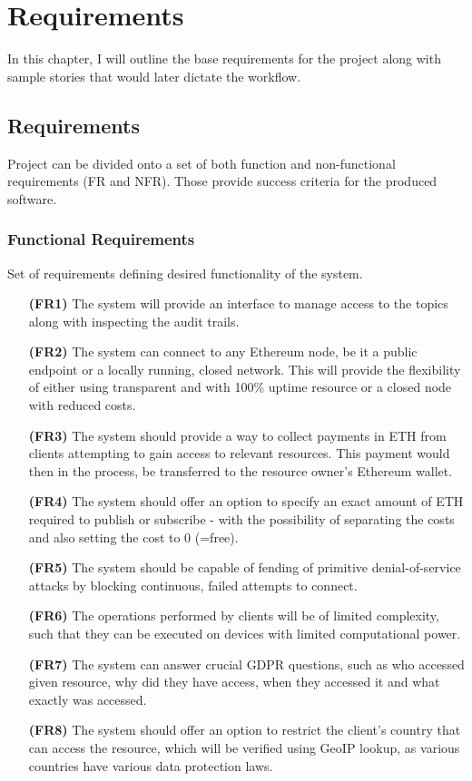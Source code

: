 \chapter{Requirements}
In this chapter, I will outline the base requirements for the project along with sample stories that would later dictate the workflow.

\section{Requirements}

Project can be divided onto a set of both function and non-functional requirements (FR and NFR). Those provide success criteria for the  produced software.

\subsection{Functional Requirements}
Set of requirements defining desired functionality of the system.

\begin{itemize}[leftmargin=4.5em]
\item[\textbf{(FR1)}] The system will provide an interface to manage access to the topics along with inspecting the audit trails.
\item[\textbf{(FR2)}] The system can connect to any Ethereum node, be it a public endpoint or a locally running, closed network. This will provide the flexibility of either using transparent and with 100\% uptime resource or a closed node with reduced costs.
\item[\textbf{(FR3)}] The system should provide a way to collect payments in ETH from clients attempting to gain access to relevant resources. This payment would then in the process, be transferred to the resource owner's Ethereum wallet.
\item[\textbf{(FR4)}] The system should offer an option to specify an exact amount of ETH required to publish or subscribe - with the possibility of separating the costs and also setting the cost to 0 (=free).
\item[\textbf{(FR5)}] The system should be capable of fending of primitive denial-of-service attacks by blocking continuous, failed attempts to connect.
\item[\textbf{(FR6)}] The operations performed by clients will be of limited complexity, such that they can be executed on devices with limited computational power.
\item[\textbf{(FR7)}] The system can answer crucial GDPR questions, such as who accessed given resource, why did they have access, when they accessed it and what exactly was accessed.
\item[\textbf{(FR8)}] The system should offer an option to restrict the client's country that can access the resource, which will be verified using GeoIP lookup, as various countries have various data protection laws.
\end{itemize}

